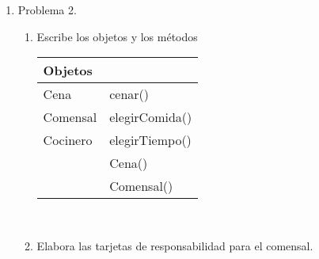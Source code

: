 \documentclass[a4paper,10pt]{article}
\begin{document}
\begin{enumerate}
\begin{enumerate}
    \end{enumerate}



    \item Problema 2.
    
    \begin{enumerate}
        \item Escribe los objetos y los métodos\\
         
        \begin{tabular}{|l|l|}
            \hline
            Objetos & \hspace{3.5cm}{Métodos(Descripción)}\\
            \hline
            Cena & cenar()\hspace{2cm}{El comensal accede a la comida}\\
            \hline
            Comensal &  elegirComida()\hspace{.8cm}{El comensal elige la comida de cada tiempo}\\
            \hline
            Cocinero  & elegirTiempo()\hspace{.8cm}{El comensal elige en que tiempo desea comenzar a cenar}\\
            \hline 
                      & Cena()\hspace{2cm}{Constructor.Inicializamos valores }\\      
            \hline          
                      & Comensal()\hspace{1.3cm}{Constructor.Inicializamos valores}\\
             \hline                
            \end{tabular}\\
\newpage
      \item Elabora las tarjetas de responsabilidad para el comensal.\\
      

\end{enumerate}
\end{enumerate}
\end{document}
